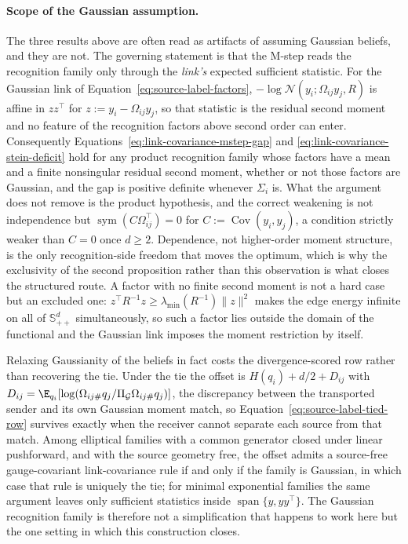 \paragraph{Scope of the Gaussian assumption.} The three results above are often read as artifacts of assuming Gaussian beliefs, and they are not. The governing statement is that the M-step reads the recognition family only through the \emph{link's} expected sufficient statistic. For the Gaussian link of Equation~\eqref{eq:source-label-factors}, \(-\log\mathcal N(y_i;\Omega_{ij}y_j,R)\) is affine in \(zz^\top\) for \(z:=y_i-\Omega_{ij}y_j\), so that statistic is the residual second moment and no feature of the recognition factors above second order can enter. Consequently Equations~\eqref{eq:link-covariance-mstep-gap} and \eqref{eq:link-covariance-stein-deficit} hold for any product recognition family whose factors have a mean and a finite nonsingular residual second moment, whether or not those factors are Gaussian, and the gap is positive definite whenever \(\Sigma_i\) is. What the argument does not remove is the product hypothesis, and the correct weakening is not independence but \(\operatorname{sym}(C\Omega_{ij}^\top)=0\) for \(C:=\operatorname{Cov}(y_i,y_j)\), a condition strictly weaker than \(C=0\) once \(d\geq2\). Dependence, not higher-order moment structure, is the only recognition-side freedom that moves the optimum, which is why the exclusivity of the second proposition rather than this observation is what closes the structured route. A factor with no finite second moment is not a hard case but an excluded one: \(z^\top R^{-1}z\geq\lambda_{\min}(R^{-1})\lVert z\rVert^2\) makes the edge energy infinite on all of \(\mathbb S_{++}^d\) simultaneously, so such a factor lies outside the domain of the functional and the Gaussian link imposes the moment restriction by itself.

Relaxing Gaussianity of the beliefs in fact costs the divergence-scored row rather than recovering the tie. Under the tie the offset is \(H(q_i)+d/2+D_{ij}\) with \(D_{ij}=\E_{q_i}[\log(\Omega_{ij\#}q_j/\Pi_{\mathcal G}\Omega_{ij\#}q_j)]\), the discrepancy between the transported sender and its own Gaussian moment match, so Equation~\eqref{eq:source-label-tied-row} survives exactly when the receiver cannot separate each source from that match. Among elliptical families with a common generator closed under linear pushforward, and with the source geometry free, the offset admits a source-free gauge-covariant link-covariance rule if and only if the family is Gaussian, in which case that rule is uniquely the tie; for minimal exponential families the same argument leaves only sufficient statistics inside \(\operatorname{span}\{y,yy^\top\}\). The Gaussian recognition family is therefore not a simplification that happens to work here but the one setting in which this construction closes.

